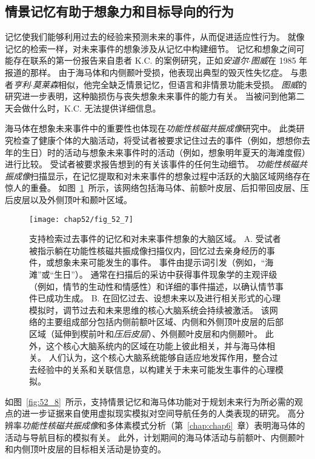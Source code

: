 \subsection{情景记忆有助于想象力和目标导向的行为}

记忆使我们能够利用过去的经验来预测未来的事件，从而促进适应性行为。
就像记忆的检索一样，对未来事件的想象涉及从记忆中构建细节。
记忆和想象之间可能存在联系的第一份报告来自患者 K.C. 的案例研究，正如\textit{安道尔$\cdot$图威}在 1985 年报道的那样。
由于海马体和内侧颞叶受损，他表现出典型的毁灭性失忆症。
与患者\textit{亨利$\cdot$莫莱森}相似，他完全缺乏情景记忆，但语言和非情景功能未受损。
\textit{图威}的研究进一步表明，这种脑损伤与丧失想象未来事件的能力有关。
当被问到他第二天会做什么时，K.C. 无法提供详细信息。


海马体在想象未来事件中的重要性也体现在\textit{功能性核磁共振成像}研究中。
此类研究检查了健康个体的大脑活动，将受试者被要求记住过去的事件（例如，想想你去年的生日）时的活动与想象未来事件时的活动（例如，想象明年夏天的海滩度假）进行比较。
受试者被要求报告想到的有关该事件的任何生动细节。
\textit{功能性核磁共振成像}扫描显示，在记忆提取和对未来事件的想象过程中活跃的大脑区域网络存在惊人的重叠。
如图~\ref{fig:52_7}~所示，该网络包括海马体、前额叶皮层、后扣带回皮层、压后皮层以及外侧顶叶和颞叶区域。


\begin{figure}[htbp]
	\centering
	\texttt{[image: chap52/fig\_52\_7]}
	\caption{支持检索过去事件的记忆和对未来事件想象的大脑区域\cite{schacter2017episodic}。
		A. 受试者被指示躺在功能性核磁共振成像扫描仪内，回忆过去亲身经历的事件，或想象未来可能发生的事件。
		事件由提示词引发（例如，“海滩”或“生日”）。
		通常在扫描后的采访中获得事件现象学的主观评级（例如，情节的生动性和情感性）和详细的事件描述，以确认情节事件已成功生成。
		B. 在回忆过去、设想未来以及进行相关形式的心理模拟时，调节过去和未来思维的核心大脑系统会持续被激活。
		该网络的主要组成部分包括内侧前额叶区域、内侧和外侧顶叶皮层的后部区域（延伸到楔前叶和\textit{压后皮层}）、外侧颞叶皮层和内侧颞叶。
		此外，这个核心大脑系统内的区域在功能上彼此相关，并与海马体相关。
		人们认为，这个核心大脑系统能够自适应地发挥作用，整合过去经验中的关系和关联信息，以构建关于未来可能发生事件的心理模拟。}
	\label{fig:52_7}
\end{figure}


如图~\ref{fig:52_8}~所示，支持情景记忆和海马体功能对于规划未来行为所必需的观点的进一步证据来自使用虚拟现实模拟对空间导航任务的人类表现的研究。
高分辨率\textit{功能性核磁共振成像}和多体素模式分析（第~\ref{chap:chap6}~章）表明海马体的活动与导航目标的模拟有关。
此外，计划期间的海马体活动与前额叶、内侧颞叶和内侧顶叶皮层的目标相关活动是协变的。


